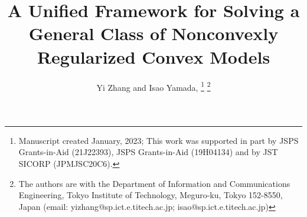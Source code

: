 \documentclass[lettersize,journal]{IEEEtran}
\theoremstyle{plain}%
\theoremstyle{definition}
\theoremstyle{remark}
\begin{document}
\newcommand{\Real}{\mathbb{R}}
\newcommand{\Natural}{\mathbb{N}}
\newcommand{\Bdd}{\mathcal{B}}
\newcommand{\Xsp}{\mathcal{X}}
\newcommand{\Ysp}{\mathcal{Y}}
\newcommand{\Zsp}{\mathcal{Z}}
\newcommand{\Pcal}{\mathcal{P}}

\newcommand{\Am}{\bm{A}}
\newcommand{\Bm}{\bm{B}}
\newcommand{\Dm}{\bm{D}}
\newcommand{\Em}{\bm{E}}
\newcommand{\Lm}{\bm{L}}
\newcommand{\Mm}{\bm{M}}
\newcommand{\Xm}{\bm{X}}
\newcommand{\Ym}{\bm{Y}}
\newcommand{\Zm}{\bm{Z}}
\newcommand{\Nm}{\bm{N}}
\newcommand{\Xim}{\bm{\Xi}}
\newcommand{\Imat}{\bm{I}}

\newcommand{\av}{\bm{a}}
\newcommand{\bv}{\bm{b}}
\newcommand{\ev}{\bm{e}}
\newcommand{\xv}{\bm{x}}
\newcommand{\sv}{\bm{s}}
\newcommand{\uv}{\bm{u}}
\newcommand{\vv}{\bm{v}}
\newcommand{\zv}{\bm{z}}
\newcommand{\yv}{\bm{y}}
\newcommand{\parentheses}[1]{\left( #1 \right )}
\newcommand{\brackets}[1]{\left[ #1 \right]}
\newcommand{\braces}[1]{\left\{ #1 \right\}}
\newcommand{\norm}[1]{\left\| #1 \right\|}
\newcommand{\argmin}{\mathrm{arg\,min}}
\newcommand{\innerp}[2]{\langle #1, #2 \rangle}
\newcommand{\lev}[1]{\textrm{lev}_{\leq #1}}
\newcommand{\dom}{\textrm{dom\,}}
\newcommand{\cont}{\textrm{cont\,}}
\newcommand{\interior}{\textrm{int\,}}
\newcommand{\txtred}[1]{\textcolor{red}{#1}}
\newcommand{\txtblue}[1]{\textcolor{blue}{#1}}
\newcommand{\Prox}{\mathrm{Prox}}
\newcommand{\Conv}{\textrm{Conv}}
\newcommand{\dist}{\textrm{dist}}
\newcommand{\levelset}{\mathrm{lev}}
\newcommand{\blkdiag}{\textrm{blkdiag}}
\newcommand{\vectorize}{\textrm{vec}}
\newcommand{\trace}{\textrm{tr}}

\title{A Unified Framework for Solving a General Class of Nonconvexly Regularized Convex Models}
\author{Yi Zhang and Isao Yamada, 
\thanks{Manuscript created January, 2023; This work was supported in part by JSPS Grants-in-Aid (21J22393), JSPS Grants-in-Aid (19H04134) and by JST SICORP (JPMJSC20C6).}
\thanks{The authors are with the Department of Information and Communications Engineering, Tokyo Institute of Technology, Meguro-ku, Tokyo 152-8550, Japan (email: yizhang@sp.ict.e.titech.ac.jp; isao@sp.ict.e.titech.ac.jp)}}


\maketitle
\end{document}
